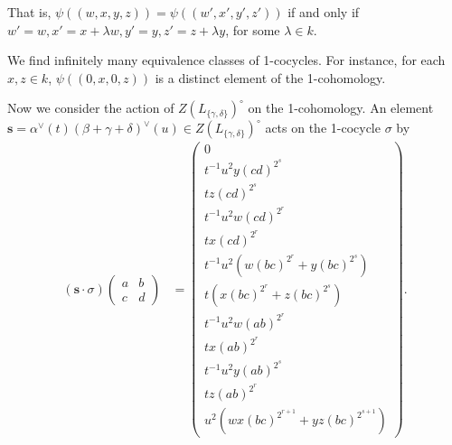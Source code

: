 That is, $\psi((w,x,y,z)) = \psi((w',x', y', z'))$ if and only if $w'=w, x'=x+\lambda w, y'=y, z'=z+\lambda y$, for some $\lambda\in k$.

We find infinitely many equivalence classes of 1-cocycles. For instance, for each $x, z\in k$, $\psi((0,x,0,z))$ is a distinct element of the 1-cohomology.

Now we consider the action of $Z(L_{\{\gamma,\delta\}})^\circ$ on the 1-cohomology. An element $\mathbf{s} = \alpha^\vee(t)(\beta + \gamma + \delta)^\vee(u)\in Z(L_{\{\gamma,\delta\}})^\circ$ acts on the 1-cocycle $\sigma$ by
\begin{align*}
(\mathbf{s}\cdot\sigma)\left(\begin{matrix} a & b \\ c & d\end{matrix}\right)
&=
\left(\begin{matrix}
0 \\
t^{-1}u^{2}y(cd)^{2^s} \\
tz(cd)^{2^s} \\
t^{-1}u^{2}w(cd)^{2^r} \\
tx(cd)^{2^r} \\
t^{-1}u^{2}(w(bc)^{2^r} + y(bc)^{2^s}) \\
t(x(bc)^{2^r} + z(bc)^{2^s}) \\
t^{-1}u^{2}w(ab)^{2^r} \\
tx(ab)^{2^r}  \\
t^{-1}u^{2}y(ab)^{2^s} \\
tz(ab)^{2^r} \\
u^2(wx(bc)^{2^{r+1}} + yz(bc)^{2^{s+1}})
\end{matrix}\right).
\end{align*}

